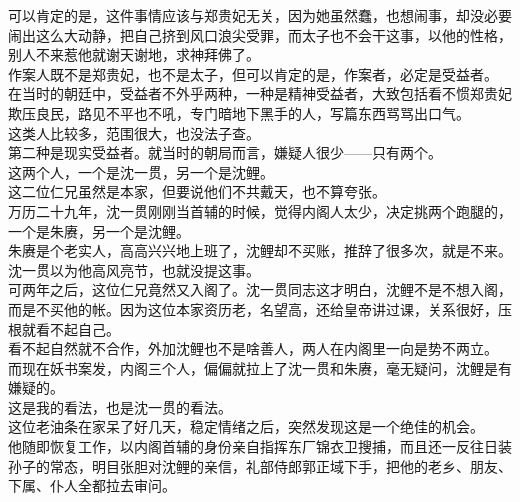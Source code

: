 \begin{multicols}{\theparacolNo}
可以肯定的是，这件事情应该与郑贵妃无关，因为她虽然蠢，也想闹事，却没必要闹出这么大动静，把自己挤到风口浪尖受罪，而太子也不会干这事，以他的性格，别人不来惹他就谢天谢地，求神拜佛了。\\

作案人既不是郑贵妃，也不是太子，但可以肯定的是，作案者，必定是受益者。\\

在当时的朝廷中，受益者不外乎两种，一种是精神受益者，大致包括看不惯郑贵妃欺压良民，路见不平也不吼，专门暗地下黑手的人，写篇东西骂骂出口气。\\

这类人比较多，范围很大，也没法子查。\\

第二种是现实受益者。就当时的朝局而言，嫌疑人很少——只有两个。\\

这两个人，一个是沈一贯，另一个是沈鲤。\\

这二位仁兄虽然是本家，但要说他们不共戴天，也不算夸张。\\

万历二十九年，沈一贯刚刚当首辅的时候，觉得内阁人太少，决定挑两个跑腿的，一个是朱赓，另一个是沈鲤。\\

朱赓是个老实人，高高兴兴地上班了，沈鲤却不买账，推辞了很多次，就是不来。沈一贯以为他高风亮节，也就没提这事。\\

可两年之后，这位仁兄竟然又入阁了。沈一贯同志这才明白，沈鲤不是不想入阁，而是不买他的帐。因为这位本家资历老，名望高，还给皇帝讲过课，关系很好，压根就看不起自己。\\

看不起自然就不合作，外加沈鲤也不是啥善人，两人在内阁里一向是势不两立。\\

而现在妖书案发，内阁三个人，偏偏就拉上了沈一贯和朱赓，毫无疑问，沈鲤是有嫌疑的。\\

这是我的看法，也是沈一贯的看法。\\

这位老油条在家呆了好几天，稳定情绪之后，突然发现这是一个绝佳的机会。\\

他随即恢复工作，以内阁首辅的身份亲自指挥东厂锦衣卫搜捕，而且还一反往日装孙子的常态，明目张胆对沈鲤的亲信，礼部侍郎郭正域下手，把他的老乡、朋友、下属、仆人全都拉去审问。\\


\end{multicols}
